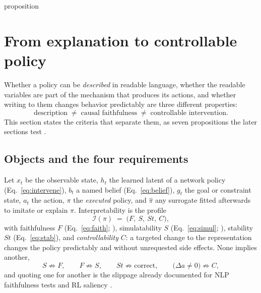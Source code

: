 \ifcsname proposition\endcsname\else\newtheorem{proposition}{Proposition}\fi
\providecommand{\E}{\mathbb{E}}
\providecommand{\Prob}{\mathbb{P}}
\providecommand{\ind}{\mathbf{1}}

\section{From explanation to controllable policy}
\label{sec:theory}

Whether a policy can be \emph{described} in readable language, whether the readable
variables are part of the mechanism that produces its actions, and whether writing to them
changes behavior predictably are three different properties:
\begin{equation}
\text{description} \;\neq\; \text{causal faithfulness} \;\neq\; \text{controllable intervention}.
\label{eq:hierarchy}
\end{equation}
This section states the criteria that separate them, as seven propositions the later sections
test \citep{rudin2019,doshivelez2017}.

\subsection{Objects and the four requirements}
\label{sec:theory:four}

Let $x_t$ be the observable state, $h_t$ the learned latent of a network policy
(Eq.~\ref{eq:intervene}), $b_t$ a named belief (Eq.~\ref{eq:belief}), $g_t$ the goal or
constraint state, $a_t$ the action, $\pi$ the \emph{executed} policy, and $\hat\pi$ any
surrogate fitted afterwards to imitate or explain $\pi$. Interpretability is the profile
\begin{equation}
\mathcal{I}(\pi) \;=\; \big(F,\ S,\ S\!t,\ C\big),
\label{eq:profile}
\end{equation}
with faithfulness $F$ (Eq.~\ref{eq:faith}; \citealp{jacovi2020}), simulatability $S$
(Eq.~\ref{eq:simul}; \citealp{lipton2018}), stability $S\!t$ (Eq.~\ref{eq:stab}), and
\emph{controllability} $C$: a targeted change to the representation changes the policy
predictably and without unrequested side effects. None implies another,
\begin{equation}
S \not\Rightarrow F, \qquad F \not\Rightarrow S, \qquad
S\!t \not\Rightarrow \text{correct}, \qquad
\big(\Delta a \neq 0\big) \not\Rightarrow C,
\label{eq:nonimply}
\end{equation}
and quoting one for another is the slippage already documented for NLP faithfulness tests
\citep{parcalabescu2024} and RL saliency \citep{atrey2020}.

